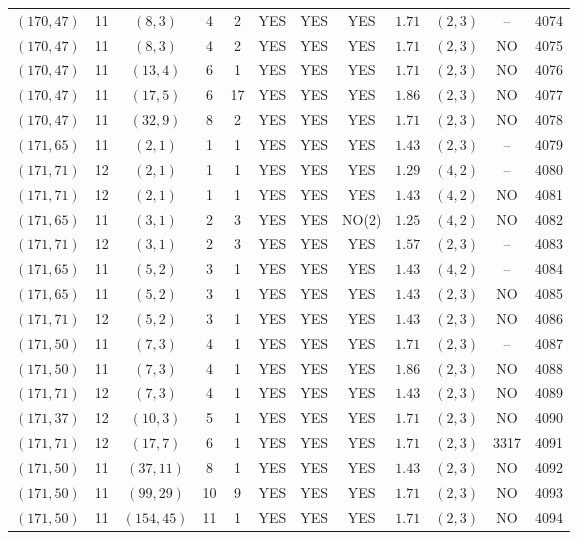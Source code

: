 \begin{longtable}{|c|c|c|c|c|c|c|c|c|c|c|c|}
$(170,47)$ & 11 & $(8,3)$ & 4 & 2 & YES & YES & YES & $1.71$ & $(2,3)$ & -- & 4074\\
$(170,47)$ & 11 & $(8,3)$ & 4 & 2 & YES & YES & YES & $1.71$ & $(2,3)$ & NO & 4075\\
$(170,47)$ & 11 & $(13,4)$ & 6 & 1 & YES & YES & YES & $1.71$ & $(2,3)$ & NO & 4076\\
$(170,47)$ & 11 & $(17,5)$ & 6 & 17 & YES & YES & YES & $1.86$ & $(2,3)$ & NO & 4077\\
$(170,47)$ & 11 & $(32,9)$ & 8 & 2 & YES & YES & YES & $1.71$ & $(2,3)$ & NO & 4078\\
$(171,65)$ & 11 & $(2,1)$ & 1 & 1 & YES & YES & YES & $1.43$ & $(2,3)$ & -- & 4079\\
$(171,71)$ & 12 & $(2,1)$ & 1 & 1 & YES & YES & YES & $1.29$ & $(4,2)$ & -- & 4080\\
$(171,71)$ & 12 & $(2,1)$ & 1 & 1 & YES & YES & YES & $1.43$ & $(4,2)$ & NO & 4081\\
$(171,65)$ & 11 & $(3,1)$ & 2 & 3 & YES & YES & NO(2) & $1.25$ & $(4,2)$ & NO & 4082\\
$(171,71)$ & 12 & $(3,1)$ & 2 & 3 & YES & YES & YES & $1.57$ & $(2,3)$ & -- & 4083\\
$(171,65)$ & 11 & $(5,2)$ & 3 & 1 & YES & YES & YES & $1.43$ & $(4,2)$ & -- & 4084\\
$(171,65)$ & 11 & $(5,2)$ & 3 & 1 & YES & YES & YES & $1.43$ & $(2,3)$ & NO & 4085\\
$(171,71)$ & 12 & $(5,2)$ & 3 & 1 & YES & YES & YES & $1.43$ & $(2,3)$ & NO & 4086\\
$(171,50)$ & 11 & $(7,3)$ & 4 & 1 & YES & YES & YES & $1.71$ & $(2,3)$ & -- & 4087\\
$(171,50)$ & 11 & $(7,3)$ & 4 & 1 & YES & YES & YES & $1.86$ & $(2,3)$ & NO & 4088\\
$(171,71)$ & 12 & $(7,3)$ & 4 & 1 & YES & YES & YES & $1.43$ & $(2,3)$ & NO & 4089\\
$(171,37)$ & 12 & $(10,3)$ & 5 & 1 & YES & YES & YES & $1.71$ & $(2,3)$ & NO & 4090\\
$(171,71)$ & 12 & $(17,7)$ & 6 & 1 & YES & YES & YES & $1.71$ & $(2,3)$ & 3317 & 4091\\
$(171,50)$ & 11 & $(37,11)$ & 8 & 1 & YES & YES & YES & $1.43$ & $(2,3)$ & NO & 4092\\
$(171,50)$ & 11 & $(99,29)$ & 10 & 9 & YES & YES & YES & $1.71$ & $(2,3)$ & NO & 4093\\
$(171,50)$ & 11 & $(154,45)$ & 11 & 1 & YES & YES & YES & $1.71$ & $(2,3)$ & NO & 4094\\

\end{longtable}
